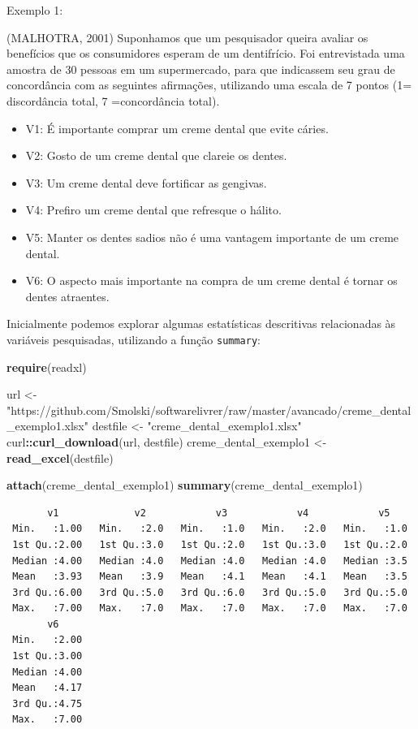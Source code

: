 \documentclass[12pt,brazil,oneside]{book}
\newenvironment{Shaded}{\begin{snugshade}}{\end{snugshade}}
\newcommand{\KeywordTok}[1]{\textcolor[rgb]{0.13,0.29,0.53}{\textbf{#1}}}
\newcommand{\NormalTok}[1]{#1}
\newcommand{\OperatorTok}[1]{\textcolor[rgb]{0.81,0.36,0.00}{\textbf{#1}}}
\newcommand{\StringTok}[1]{\textcolor[rgb]{0.31,0.60,0.02}{#1}}
\providecommand{\tightlist}{%
  \setlength{\itemsep}{0pt}\setlength{\parskip}{0pt}}
\begin{document}
Exemplo 1:

(MALHOTRA, 2001) Suponhamos que um pesquisador queira avaliar os
benefícios que os consumidores esperam de um dentifrício. Foi
entrevistada uma amostra de 30 pessoas em um supermercado, para que
indicassem seu grau de concordância com as seguintes afirmações,
utilizando uma escala de 7 pontos (1= discordância total, 7
=concordância total).

\begin{itemize}
\tightlist
\item
  V1: É importante comprar um creme dental que evite cáries.
\item
  V2: Gosto de um creme dental que clareie os dentes.
\item
  V3: Um creme dental deve fortificar as gengivas.
\item
  V4: Prefiro um creme dental que refresque o hálito.
\item
  V5: Manter os dentes sadios não é uma vantagem importante de um creme
  dental.
\item
  V6: O aspecto mais importante na compra de um creme dental é tornar os
  dentes atraentes.
\end{itemize}

Inicialmente podemos explorar algumas estatísticas descritivas
relacionadas às variáveis pesquisadas, utilizando a função
\texttt{summary}:

\begin{Shaded}
\begin{Highlighting}[]
\KeywordTok{require}\NormalTok{(readxl)}

\NormalTok{url <-}\StringTok{ "https://github.com/Smolski/softwarelivrer/raw/master/avancado/creme_dental_exemplo1.xlsx"}
\NormalTok{destfile <-}\StringTok{ "creme_dental_exemplo1.xlsx"}
\NormalTok{curl}\OperatorTok{::}\KeywordTok{curl_download}\NormalTok{(url, destfile)}
\NormalTok{creme_dental_exemplo1 <-}\StringTok{ }\KeywordTok{read_excel}\NormalTok{(destfile)}

\KeywordTok{attach}\NormalTok{(creme_dental_exemplo1)}
\KeywordTok{summary}\NormalTok{(creme_dental_exemplo1)}
\end{Highlighting}
\end{Shaded}

\begin{verbatim}
       v1             v2            v3            v4            v5     
 Min.   :1.00   Min.   :2.0   Min.   :1.0   Min.   :2.0   Min.   :1.0  
 1st Qu.:2.00   1st Qu.:3.0   1st Qu.:2.0   1st Qu.:3.0   1st Qu.:2.0  
 Median :4.00   Median :4.0   Median :4.0   Median :4.0   Median :3.5  
 Mean   :3.93   Mean   :3.9   Mean   :4.1   Mean   :4.1   Mean   :3.5  
 3rd Qu.:6.00   3rd Qu.:5.0   3rd Qu.:6.0   3rd Qu.:5.0   3rd Qu.:5.0  
 Max.   :7.00   Max.   :7.0   Max.   :7.0   Max.   :7.0   Max.   :7.0  
       v6      
 Min.   :2.00  
 1st Qu.:3.00  
 Median :4.00  
 Mean   :4.17  
 3rd Qu.:4.75  
 Max.   :7.00  
\end{verbatim}
\end{document}
